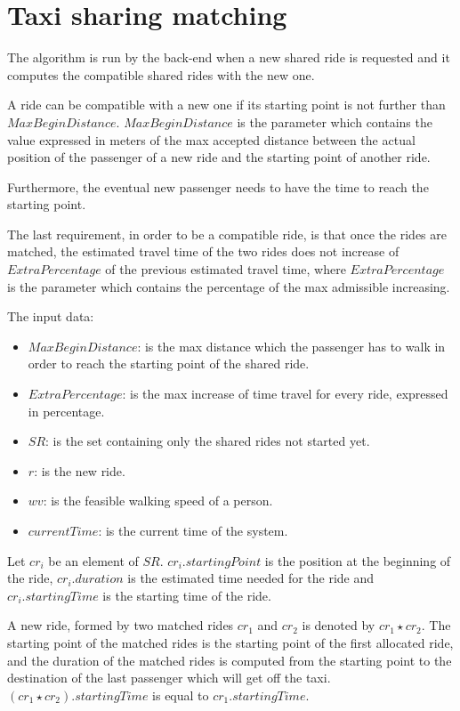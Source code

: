 \section{Taxi sharing matching}
\label{sec:taxi-sharing-matching}
The algorithm is run by the back-end when a new shared ride is requested and it computes the compatible shared rides with the new one.

A ride can be compatible with a new one if its starting point is not further than $MaxBeginDistance$. $MaxBeginDistance$ is the parameter which contains the value expressed in meters of the max accepted distance between the actual position of the passenger of a new ride and the starting point of another ride.

Furthermore, the eventual new passenger needs to have the time to reach the starting point.

The last requirement, in order to be a compatible ride, is that once the rides are matched, the estimated travel time of the two rides does not increase of $ExtraPercentage$ of the previous estimated travel time, where $ExtraPercentage$ is the parameter which contains the percentage of the max admissible increasing.

The input data:
\begin{itemize}
	\item $MaxBeginDistance$: is the max distance which the passenger has to walk in order to reach the starting point of the shared ride.
	\item $ExtraPercentage$: is the max increase of time travel for every ride, expressed in percentage.
	\item $SR$: is the set containing only the shared rides not started yet.
	\item $r$: is the new ride.
	\item $wv$: is the feasible walking speed of a person.
	\item $currentTime$: is the current time of the system.
\end{itemize}

Let $cr_i$ be an element of $SR$. $cr_i.startingPoint$ is the position at the beginning of the ride, $cr_i.duration$ is the estimated time needed for the ride and $cr_i.startingTime$ is the starting time of the ride.

A new ride, formed by two matched rides $cr_1$ and $cr_2$ is denoted by $ cr_1 \star cr_2 $. The starting point of the matched rides is the starting point of the first allocated ride, and the duration of the matched rides is computed from the starting point to the destination of the last passenger which will get off the taxi. $ (cr_1 \star cr_2).startingTime $ is equal to $cr_1.startingTime$.

